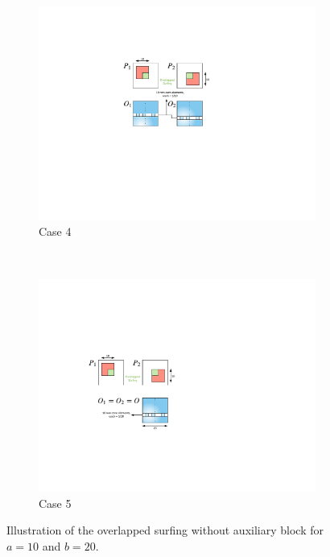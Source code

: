 	
	\begin{figure}
		\centering
		\begin{subfigure}[b]{0.22\textwidth}
			\includegraphics[width=\textwidth]{./img/case4-2}
			\caption{Case 4}
			\label{fig:case4}
		\end{subfigure}
		~ %
		\begin{subfigure}[b]{0.22\textwidth}
			\includegraphics[width=\textwidth]{./img/case5-2}
			\caption{Case 5}
			\label{fig:case5}
		\end{subfigure}
		\caption{Illustration of the overlapped surfing without auxiliary block for $a = 10$ and $b = 20$.}\label{fig:osurf}
	\end{figure}
	

